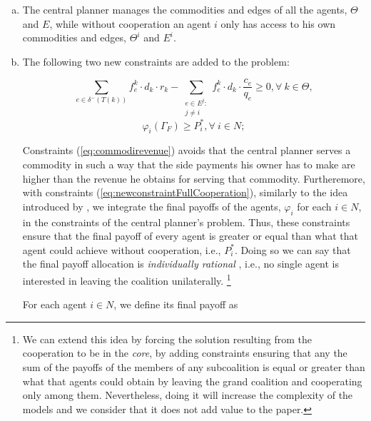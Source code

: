 \documentclass[authoryear]{elsarticle}
\begin{document}
\begin{enumerate}[(a)]
	\item The central planner manages the commodities and edges of
all the agents, $\Theta$ and $E$, while without cooperation an agent $i$ only has access to his own commodities and edges, $\Theta^i$ and $E^i$.
	\item The following two new constraints are added to the problem:

\begin{equation}
\sum_{e \in \delta^-(T(k))}  f_e^k \cdot d_k \cdot r_k - \sum_{\substack{e \in E^j\colon \\ j\not = i}} f_e^k \cdot d_k \cdot \frac{c_e}{q_e}\geq 0,  \forall\ k \in \Theta, \label{eq:commodirevenue}
\end{equation}
\begin{equation}
\varphi_i(\Gamma_F) \geq P_i^*,  \forall\ i\in N; \label{eq:newconstraintFullCooperation}
\end{equation}

Constraints (\ref{eq:commodirevenue}) avoids that the central planner serves a commodity in such a way that the side payments his owner has to make are higher than the revenue he obtains for serving that commodity. Furtheremore, with constraints (\ref{eq:newconstraintFullCooperation}), similarly to the idea introduced by \cite{VANOVERMEIRE2014125}, we integrate the final payoffs of the agents, $\varphi_i$ for each $i \in N$, in the constraints of the central planner's problem. Thus, these constraints  ensure that the final payoff of every agent is greater or equal than what that agent could achieve without cooperation, i.e., $P_i^*$.  Doing so we can say that the final payoff allocation is \emph{individually rational} \citep{GONZALEZ2010}, i.e., no single agent is interested in leaving the coalition unilaterally.  \footnote{We can extend this idea by forcing the solution resulting from the cooperation to be in the \emph{core}, by adding constraints ensuring that any the sum of the payoffs of the members of any subcoalition is equal or greater than what that agents could obtain by leaving the grand coalition and cooperating only among them. Nevertheless, doing it will increase the complexity of the models and we consider that it does not add value to the paper.}

For each agent $i\in N$, we define its final payoff as


\end{enumerate}
\end{document}
